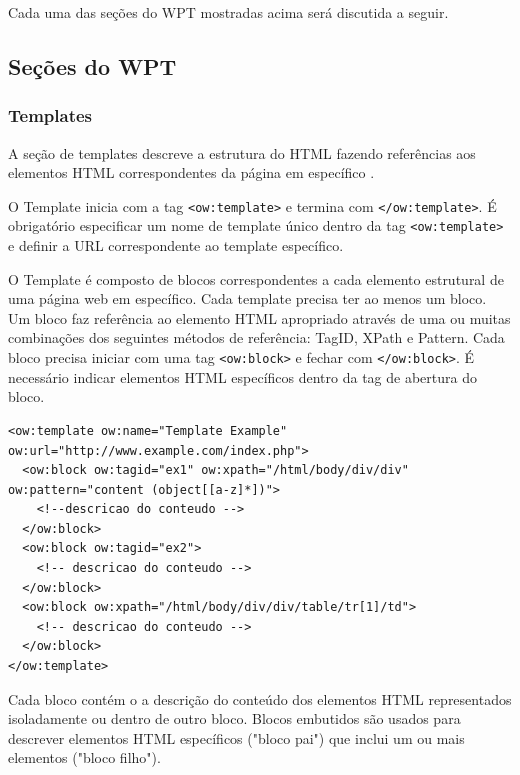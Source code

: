 Cada uma das seções do WPT mostradas acima será discutida a seguir.

\subsection{Seções do WPT}

\subsubsection{Templates}

A seção de templates descreve a estrutura do HTML fazendo referências aos elementos HTML correspondentes da página em específico \cite{wpt}.

O Template inicia com a tag \texttt{<ow:template>} e termina com  \texttt{</ow:template>}. É obrigatório especificar um nome de template único dentro da tag \texttt{<ow:template>} e definir a URL correspondente ao template específico.

O Template é composto de blocos correspondentes a cada elemento estrutural de uma página web em específico. Cada template precisa ter ao menos um bloco. Um bloco faz referência ao elemento HTML apropriado através de uma ou muitas combinações dos seguintes métodos de referência: TagID, XPath e Pattern. Cada bloco precisa iniciar com uma tag \texttt{<ow:block>} e fechar com \texttt{</ow:block>}. É necessário indicar elementos HTML específicos dentro da tag de abertura do bloco.

\pagebreak
{}
\begin{lstlisting}
<ow:template ow:name="Template Example" ow:url="http://www.example.com/index.php">
  <ow:block ow:tagid="ex1" ow:xpath="/html/body/div/div" ow:pattern="content (object[[a-z]*])">
    <!--descricao do conteudo -->
  </ow:block>
  <ow:block ow:tagid="ex2">
    <!-- descricao do conteudo -->
  </ow:block>
  <ow:block ow:xpath="/html/body/div/div/table/tr[1]/td">
    <!-- descricao do conteudo -->
  </ow:block>
</ow:template>
\end{lstlisting}

Cada bloco contém o a descrição do conteúdo dos elementos HTML representados isoladamente ou dentro de outro bloco. Blocos embutidos são usados para descrever elementos HTML específicos ("bloco pai") que inclui um ou mais elementos ("bloco filho").

